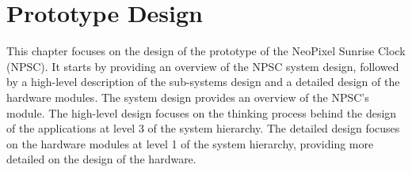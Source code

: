 \chapter{Prototype Design}
This chapter focuses on the design of the prototype of the NeoPixel Sunrise Clock (NPSC). It starts by providing an overview of the NPSC system design, followed by a high-level description of the sub-systems design and a detailed design of the hardware modules. The system design provides an overview of the NPSC's module. The high-level design focuses on the thinking process behind the design of the applications at level 3 of the system hierarchy. The detailed design focuses on the hardware modules at level 1 of the system hierarchy, providing more detailed on the design of the hardware.

